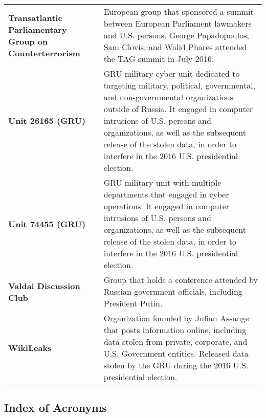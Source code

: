 \begin{longtable}{ p{} p{} }
    \textbf{Transatlantic Parliamentary Group on Counterterrorism} & European group that sponsored a summit between European Parliament lawmakers and U.S. persons. George Papadopoulos, Sam Clovis, and Walid Phares attended the TAG summit in July 2016. \\

    \textbf{Unit 26165 (GRU)} & GRU military cyber unit dedicated to targeting military, political, governmental, and non-governmental organizations outside of Russia. It engaged in computer intrusions of U.S. persons and organizations, as well as the subsequent release of the stolen data, in order to interfere in the 2016 U.S. presidential election. \\

    \textbf{Unit 74455 (GRU)} & GRU military unit with multiple departments that engaged in cyber operations. It engaged in computer intrusions of U.S. persons and organizations, as well as the subsequent release of the stolen data, in order to interfere in the 2016 U.S. presidential election. \\

    \textbf{Valdai Discussion Club} & Group that holds a conference attended by Russian government officials, including President Putin. \\

    \textbf{WikiLeaks} & Organization founded by Julian Assange that posts information online, including data stolen from private, corporate, and U.S. Government entities. Released data stolen by the GRU during the 2016 U.S. presidential election.

\end{longtable}

\subsection{Index of Acronyms}

